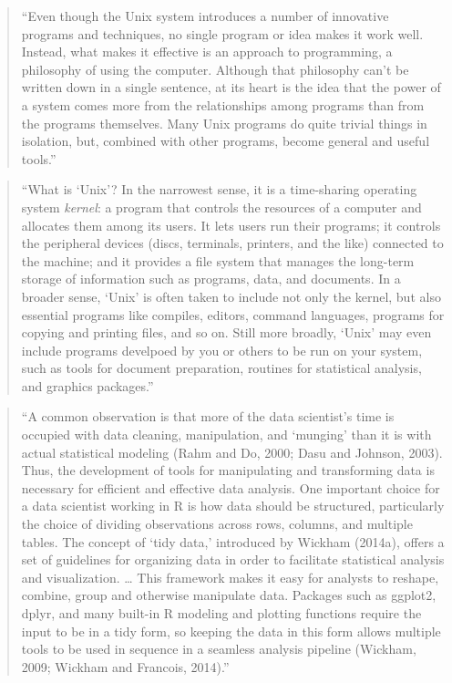 \documentclass[]{tufte-book}
\begin{document}
\begin{quote}
``Even though the Unix system introduces a number of innovative programs and techniques,
no single program or idea makes it work well. Instead, what makes it effective is an approach
to programming, a philosophy of using the computer. Although that philosophy can't be written
down in a single sentence, at its heart is the idea that the power of a system comes more from
the relationships among programs than from the programs themselves. Many Unix programs do
quite trivial things in isolation, but, combined with other programs, become general and
useful tools.'' \citep{kernighan1984unix}
\end{quote}

\begin{quote}
``What is `Unix'? In the narrowest sense, it is a time-sharing operating system \emph{kernel}:
a program that controls the resources of a computer and allocates them among its users.
It lets users run their programs; it controls the peripheral devices (discs, terminals,
printers, and the like) connected to the machine; and it provides a file system that
manages the long-term storage of information such as programs, data, and documents.
In a broader sense, `Unix' is often taken to include not only the kernel, but also
essential programs like compiles, editors, command languages, programs for copying and
printing files, and so on. Still more broadly, `Unix' may even include programs
develpoed by you or others to be run on your system, such as tools for document
preparation, routines for statistical analysis, and graphics packages.'' \citep{kernighan1984unix}
\end{quote}

\begin{quote}
``A common observation is that more of the data scientist's time is occupied
with data cleaning, manipulation, and `munging' than it is with actual
statistical modeling (Rahm and Do, 2000; Dasu and Johnson, 2003). Thus, the
development of tools for manipulating and transforming data is necessary for
efficient and effective data analysis. One important choice for a data scientist
working in R is how data should be structured, particularly the choice of
dividing observations across rows, columns, and multiple tables. The concept of
`tidy data,' introduced by Wickham (2014a), offers a set of guidelines for
organizing data in order to facilitate statistical analysis and visualization. \ldots{} This framework makes it easy for analysts to reshape, combine, group and otherwise manipulate data. Packages such as ggplot2, dplyr, and many built-in R modeling and plotting functions require the input to be in a tidy form, so keeping the data in this form allows multiple tools
to be used in sequence in a seamless analysis pipeline (Wickham, 2009; Wickham and Francois,
2014).''
\citep{robinson2014broom}
\end{quote}
\end{document}
